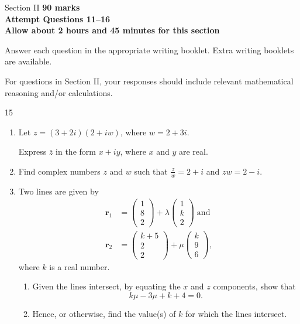 \documentclass[12pt]{extarticle}
\begin{document}
\pagebreak
\begin{sectionheader}{Section II}
	\textbf{90 marks\\
		Attempt Questions 11--16\\
		Allow about 2 hours and 45 minutes for this section}

	Answer each question in the appropriate writing booklet. Extra writing booklets are available.

	For questions in Section II, your responses should include relevant mathematical reasoning and/or calculations.
\end{sectionheader}
\begin{shortanswer}
	\begin{bookletquestion}{15}
		\begin{enumerate}
			\item {} Let $z = (3+2i)(2+iw)$, where $w=2+3i$.

			      Express $\bar{z}$ in the form $x+iy$, where $x$ and $y$ are real.
			\item {} Find complex numbers $z$ and $w$ such that $\frac{z}{w}=2+i$ and $zw=2-i$.
			\item Two lines are given by
			      \begin{align*}
				      \mathbf{r}_1 & = \begin{pmatrix} 1 \\ 8 \\ 2 \end{pmatrix} + \lambda \begin{pmatrix} 1 \\ k \\ 2 \end{pmatrix} \;\text{and} \\[1em]
				      \mathbf{r}_2 & = \begin{pmatrix} k+5 \\ 2 \\ 2 \end{pmatrix} + \mu \begin{pmatrix} k \\ 9 \\ 6 \end{pmatrix},
			      \end{align*}
			      where $k$ is a real number.
			      \begin{enumerate}
				      \item {} Given the lines intersect, by equating the $x$ and $z$ components, show that
				            \[k\mu - 3\mu + k + 4 = 0.\]
				      \item {} Hence, or otherwise, find the value(s) of $k$ for which the lines intersect.
			      \end{enumerate}
			      \questionbreak


\end{enumerate}
\end{bookletquestion}
\end{shortanswer}
\end{document}
